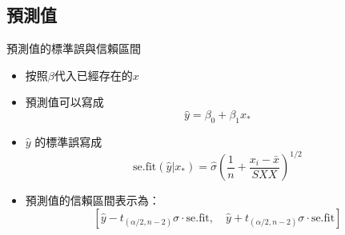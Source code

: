 \documentclass[xcolor=dvipsnames]{beamer}
\begin{document}
\subsection{預測值}
\begin{frame}{預測值的標準誤與信賴區間}
\begin{itemize}
\item 按照$\beta$代入已經存在的$x$
\item 預測值可以寫成
\[\hat{y}=\beta_{0}+\beta_{1}x_{*}\]
\item $\hat{y}$ 的標準誤寫成
\[\textrm{se.fit}(\hat{y}|x_{*})=\hat{\sigma}(\frac{1}{n}+\frac{x_{i}-\bar{x}}{SXX})^{1/2}\]
\item 預測值的信賴區間表示為：
\[[\hat{y}-t_{(\alpha/2, n-2)}\sigma\cdot \textrm{se.fit},\hspace{1em} 
\hat{y}+t_{(\alpha/2, n-2)}\sigma\cdot \textrm{se.fit}] \]
\end{itemize}
\end{frame}
\end{document}

